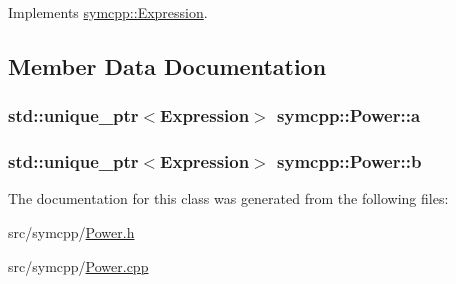 Implements \hyperlink{classsymcpp_1_1Expression_aaef29b0afa2d6c21fe35f47a1be76134}{symcpp\+::\+Expression}.



\subsection{Member Data Documentation}
\subsubsection[{\texorpdfstring{a}{a}}]{\setlength{\rightskip}{0pt plus 5cm}std\+::unique\+\_\+ptr$<${\bf Expression}$>$ symcpp\+::\+Power\+::a\hspace{0.3cm}{\ttfamily [private]}}\hypertarget{classsymcpp_1_1Power_aa36a8b5499b378ec9bd705ea9a9e77ce}{}\label{classsymcpp_1_1Power_aa36a8b5499b378ec9bd705ea9a9e77ce}
\subsubsection[{\texorpdfstring{b}{b}}]{\setlength{\rightskip}{0pt plus 5cm}std\+::unique\+\_\+ptr$<${\bf Expression}$>$ symcpp\+::\+Power\+::b\hspace{0.3cm}{\ttfamily [private]}}\hypertarget{classsymcpp_1_1Power_add4b954bcfa942f2d14ed40713d92ad8}{}\label{classsymcpp_1_1Power_add4b954bcfa942f2d14ed40713d92ad8}


The documentation for this class was generated from the following files\+:\begin{DoxyCompactItemize}
\item 
src/symcpp/\hyperlink{Power_8h}{Power.\+h}\item 
src/symcpp/\hyperlink{Power_8cpp}{Power.\+cpp}\end{DoxyCompactItemize}
